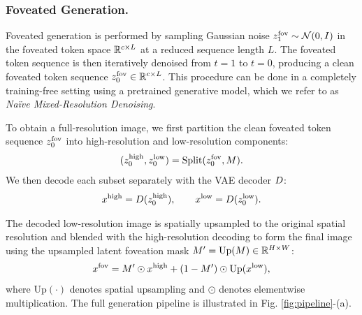 \subsubsection{Foveated Generation. }
\label{subsubsec:fovinfer}
Foveated generation is performed by sampling Gaussian noise $\latentFOV[1] \sim \mathcal{N}(0, I)$ in the foveated token space $\mathbb{R}^{c \times L}$ at a reduced sequence length $L$. The foveated token sequence is then iteratively denoised from $t=1$ to $t=0$,
producing a clean foveated token sequence $\latentFOV[0] \in \latentspacefoveated$. This procedure can be done in a completely training-free setting using a pretrained generative model, which we refer to as \emph{Na\"ive Mixed-Resolution Denoising}.


To obtain a full-resolution image, we first partition the clean foveated token sequence $\latentFOV[0]$ into 
high-resolution and low-resolution components:
\begin{align}
    (\latentHR[0], \latentLR[0]) 
    = \mathrm{Split}(\latentFOV[0], M).
    \label{eq:split_fov_latent}
\end{align}
We then decode each subset separately with the VAE decoder $D$:
\begin{align}
    \imageHR = \decoder(\latentHR[0]), 
    \qquad
    \imageLR = \decoder(\latentLR[0]).
    \label{eq:vae_decode}
\end{align}


The decoded low-resolution image is spatially upsampled to the original 
spatial resolution and blended with the high-resolution decoding to form the 
final image using the upsampled latent foveation mask $M'=\mathrm{Up}(M)\in \mathbb{R}^{H \times W}$:
\begin{align}
    x^{\text{fov}}
    = M' \odot x^{\text{high}}
    + (1 - M') \odot \mathrm{Up}(x^{\text{low}}),
    \label{eq:image_merge}
\end{align}
where $\mathrm{Up}(\cdot)$ denotes spatial upsampling and $\odot$ denotes 
elementwise multiplication. The full generation pipeline is illustrated in Fig. \ref{fig:pipeline}-(a).

